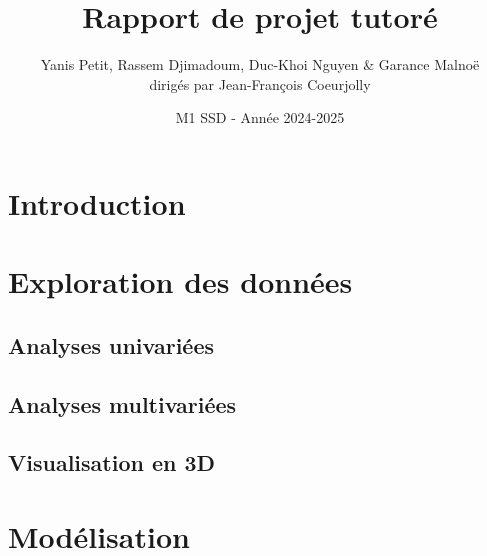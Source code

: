 \documentclass[12pt]{article}
\title{Rapport de projet tutoré}
\author{Yanis Petit, Rassem Djimadoum, Duc-Khoi Nguyen \& Garance Malnoë \\dirigés par Jean-François Coeurjolly}
\date{M1 SSD - Année 2024-2025}
\begin{document}
\maketitle
\tableofcontents
\section{Introduction}

\section{Exploration des données}
\subsection{Analyses univariées}
\subsection{Analyses multivariées}
\subsection{Visualisation en 3D}

\section{Modélisation}
\end{document}
